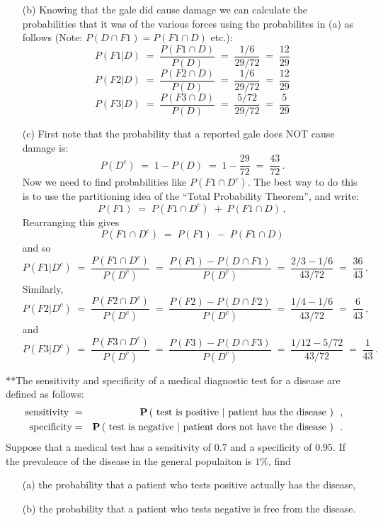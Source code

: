 \begin{ExerciseList}
\begin{itemize}
\item[(b)] Knowing that the gale did cause damage we can calculate the probabilities that it was of the various forces using the probabilites in (a) as follows (Note: $P(D\cap F1)= P(F1\cap D)$ etc.):
{$$P(F1|D)\;=\;\frac{P(F1\cap D)}{P(D)}\;=\;\frac{1/6}{29/72}\;=\;\frac{12}{29}$$
$$P(F2|D)\;=\;\frac{P(F2\cap D)}{P(D)}\;=\;\frac{1/6}{29/72}\;=\;\frac{12}{29}$$
$$P(F3|D)\;=\;\frac{P(F3\cap D)}{P(D)}\;=\;\frac{5/72}{29/72}\;=\;\frac{5}{29}$$
}

\item[(c)]First note that the probability that a reported gale does NOT
  cause damage is:
\[ P(D^c)\;=\; 1-P(D)\;=\; 1- \frac{29}{72}\;=\; \frac{43}{72}\,.\]
Now we need to find probabilities like $P(F1\cap D^c)$. The best way to
do this is to use the partitioning idea of the  ``Total Probability
Theorem'', and write:
\[ P(F1) \;=\;  P(F1\cap D^c) \;+\; P(F1\cap D)\,,\]
Rearranging this gives
\[  P(F1\cap D^c) \;= \;P(F1) \;- \; P(F1\cap D) \]
and so
\[P(F1|D^c)\;=\;\frac{P(F1\cap D^c)}{P(D^c)}\;=\;\frac{P(F1)-P(D\cap
  F1)}{P(D^c)}\;=\;\frac{2/3-1/6}{43/72}\;=\;\frac{36}{43}\,.
\]
Similarly,
\[P(F2|D^c)\;=\;\frac{P(F2\cap D^c)}{P(D^c)}\;=\;\frac{P(F2)-P(D\cap F2)}{P(D^c)}\;=\;\frac{1/4-1/6}{43/72}\;=\;\frac{6}{43}\,,\]
and
\[P(F3|D^c)\;=\;\frac{P(F3\cap D^c)}{P(D^c)}\;=\;\frac{P(F3)-P(D\cap F3)}{P(D^c)}\;=\;\frac{1/12-5/72}{43/72}\;=\;\frac{1}{43}\,.\]

\end{itemize}
\newpage


\Exercise
{**}The sensitivity and specificity of a medical diagnostic test for a disease are defined as follows:
\begin{eqnarray*}
\text{sensitivity } &=& \mathbf{P} \left( \text{ test is positive } | \text{ patient has the disease } \right) \enspace ,\\
\text{specificity} &=& \mathbf{P} \left( \text{ test is negative } | \text{ patient does not have the disease } \right) \enspace .
\end{eqnarray*}
Suppose that a medical test has a sensitivity of $0.7$ and a specificity of $0.95$.  
If the prevalence of the disease in the general populaiton is $1\%$, find
\begin{itemize}
\item[(a)] the probability that a patient who tests positive actually has the disease,
\item[(b)] the probability that a patient who tests negative is free from the disease.
\end{itemize}


\end{ExerciseList}
